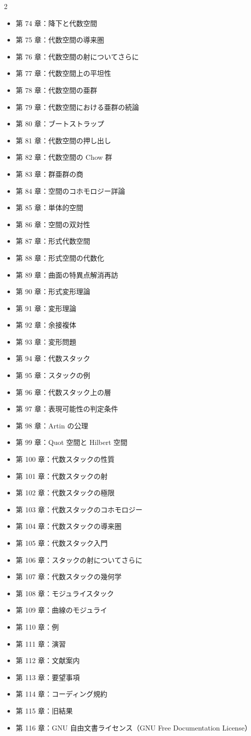 \begin{multicols}{2}
\begin{itemize}
\item 第 74 章：降下と代数空間
\item 第 75 章：代数空間の導来圏
\item 第 76 章：代数空間の射についてさらに
\item 第 77 章：代数空間上の平坦性
\item 第 78 章：代数空間の亜群
\item 第 79 章：代数空間における亜群の続論
\item 第 80 章：ブートストラップ
\item 第 81 章：代数空間の押し出し
\item 第 82 章：代数空間の Chow 群
\item 第 83 章：群亜群の商
\item 第 84 章：空間のコホモロジー詳論
\item 第 85 章：単体的空間
\item 第 86 章：空間の双対性
\item 第 87 章：形式代数空間
\item 第 88 章：形式空間の代数化
\item 第 89 章：曲面の特異点解消再訪
\item 第 90 章：形式変形理論
\item 第 91 章：変形理論
\item 第 92 章：余接複体
\item 第 93 章：変形問題
\item 第 94 章：代数スタック
\item 第 95 章：スタックの例
\item 第 96 章：代数スタック上の層
\item 第 97 章：表現可能性の判定条件
\item 第 98 章：Artin の公理
\item 第 99 章：Quot 空間と Hilbert 空間
\item 第 100 章：代数スタックの性質
\item 第 101 章：代数スタックの射
\item 第 102 章：代数スタックの極限
\item 第 103 章：代数スタックのコホモロジー
\item 第 104 章：代数スタックの導来圏
\item 第 105 章：代数スタック入門
\item 第 106 章：スタックの射についてさらに
\item 第 107 章：代数スタックの幾何学
\item 第 108 章：モジュライスタック
\item 第 109 章：曲線のモジュライ
\item 第 110 章：例
\item 第 111 章：演習
\item 第 112 章：文献案内
\item 第 113 章：要望事項
\item 第 114 章：コーディング規約
\item 第 115 章：旧結果
\item 第 116 章：GNU 自由文書ライセンス（GNU Free Documentation License）
\end{itemize}\end{multicols}

